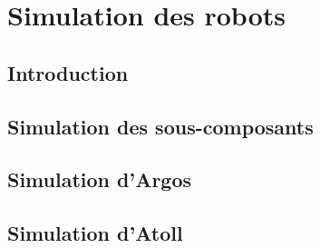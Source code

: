 \chapter{Simulation des robots}
	
	\section{Introduction}

	\section{Simulation des sous-composants}

	\section{Simulation d'Argos}

	\section{Simulation d'Atoll}